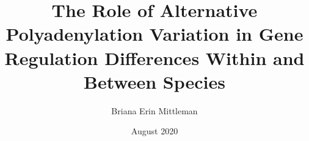 \documentclass{ucetd}
\title{The Role of Alternative Polyadenylation Variation in Gene Regulation Differences Within and Between Species}
\author{Briana Erin Mittleman}
\date{August 2020}
\begin{document}
\maketitle

\makecopyright

\makeepigraph


\tableofcontents
\listoffigures
\listoftables





\mainmatter












\makebibliography

%
%
\end{document}
